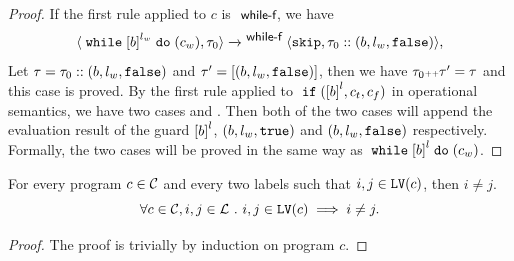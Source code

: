 \begin{proof}
  If the first rule applied to $c$ is $\textsf{\small{ while-f}}$, we have
  \[
    \config{{\ewhile \clabel{b}^{l_w} \edo (c_w), \trace_0}}
    \xrightarrow{}^\rname{while-f}
    \config{{
    \eskip,
    \trace_0 :: (b, l_w, \efalse)}},
  \]
  Let $\mathtt{\tau} = \mathtt{\tau}_0 ::(b, l_w, \mathtt{false})$ and $\mathtt{\tau}' =  [(b, l_w, \mathtt{false})]$,
  then we have $\mathtt{\tau}_0 {\scriptscriptstyle ++} \mathtt{\tau}' = \mathtt{\tau}$ and this case is proved.
  By the first rule applied to $\eif(\clabel{b}^l, c_t, c_f)$ in operational semantics,
  we have two cases  and .
  Then both of the two cases will append the evaluation result of the guard $\clabel{b}^l$, $(b, l_w, \mathtt{true})$ and $(b, l_w, \mathtt{false})$ respectively.
  \\
  Formally, the two cases will be proved in the same way as $\ewhile \clabel{b}^{l} \edo (c_w)$.
\end{proof}
\begin{lemma}
  For every program $c \in \mathcal{C}$ and every two labels such that
  $i, j \in \mathtt{LV}(c)$, then $i \neq j$.
  \[
    \forall c \in \mathcal{C}, i, j \in \mathcal{L} ~.~ i, j \in \mathtt{LV}(c)\implies i \neq j.
    \]
\end{lemma}
  \begin{proof}
    The proof is trivially by induction on program $c$.
  \end{proof}
